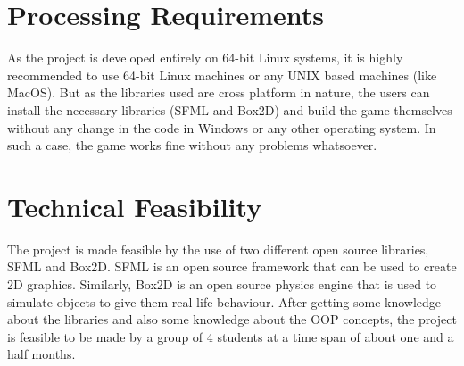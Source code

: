 \documentclass[main]{subfiles}
\begin{document}
\section{Processing Requirements}
As the project is developed entirely on 64-bit Linux systems, it is highly recommended to use 64-bit Linux machines or any UNIX based machines (like MacOS). But as the libraries used are cross platform in nature, the users can install the necessary libraries (SFML and Box2D) and build the game themselves without any change in the code in Windows or any other operating system. In such a case, the game works fine without any problems whatsoever.
	
\section{Technical Feasibility}
The project is made feasible by the use of two different open source libraries, SFML and Box2D. SFML is an open source framework that can be used to create 2D graphics. Similarly, Box2D is an open source physics engine that is used to simulate objects to give them real life behaviour. After getting some knowledge about the libraries and also some knowledge about the OOP concepts, the project is feasible to be made by a group of 4 students at a time span of about one and a half months.
\end{document}
